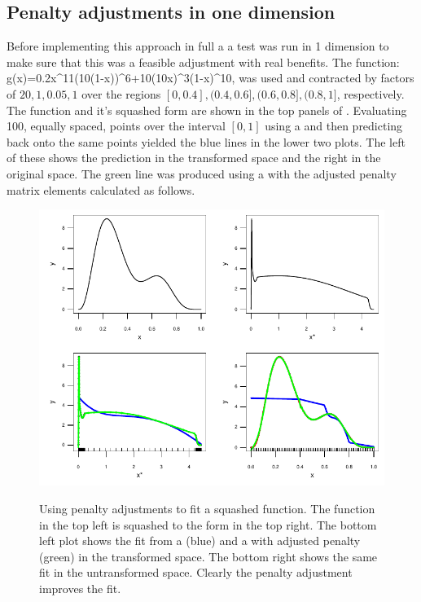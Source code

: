 \subsection{Penalty adjustments in one dimension}

Before implementing this approach in full a a test was run in 1 dimension to make sure that this was a feasible adjustment with real benefits. The function:
\be
g(x)=0.2x^{11}(10(1-x))^6+10(10x)^3(1-x)^{10},
\label{hardfcn}
\ee
was used and contracted by factors of $20,1,0.05,1$ over the regions $[0,0.4], (0.4,0.6],(0.6,0.8],(0.8,1]$, respectively. The function and it's squashed form are shown in the top panels of . Evaluating 100, equally spaced, points over the interval $[0,1]$ using a \tprs and then predicting back onto the same points yielded the blue lines in the lower two plots. The left of these shows the prediction in the transformed space and the right in the original space. The green line was produced using a \tprs with the adjusted penalty matrix elements calculated as follows.

\begin{figure}
\centering
\includegraphics[width=6in]{mds/figs/1dadjust.pdf} \\
\caption{Using penalty adjustments to fit a squashed function. The function in the top left is squashed to the form in the top right. The bottom left plot shows the fit from a \tprs (blue) and a \tprs with adjusted penalty (green) in the transformed space. The bottom right shows the same fit in the untransformed space. Clearly the penalty adjustment improves the fit.}
\label{1dadjust}
\end{figure}

